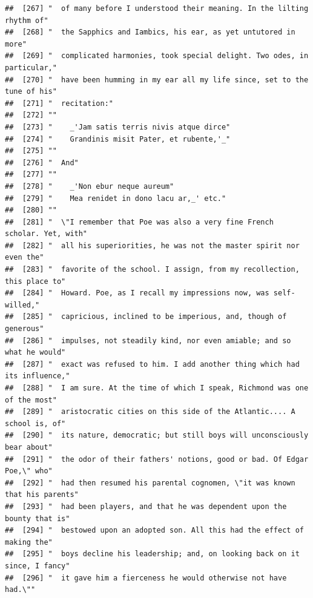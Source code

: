 \documentclass{article}\usepackage[]{graphicx}\usepackage[]{color}
\makeatletter
\newenvironment{kframe}{%
 \def\at@end@of@kframe{}%
 \ifinner\ifhmode%
  \def\at@end@of@kframe{\end{minipage}}%
  \begin{minipage}{\columnwidth}%
 \fi\fi%
 \def\FrameCommand##1{\hskip\@totalleftmargin \hskip-\fboxsep
 \colorbox{shadecolor}{##1}\hskip-\fboxsep
     \hskip-\linewidth \hskip-\@totalleftmargin \hskip\columnwidth}%
 \MakeFramed {\advance\hsize-\width
   \@totalleftmargin\z@ \linewidth\hsize
   \@setminipage}}%
 {\par\unskip\endMakeFramed%
 \at@end@of@kframe}
\newenvironment{knitrout}{}{} %
\makeatother
\begin{document}
\begin{knitrout}
\begin{kframe}
\begin{verbatim}
##  [267] "  of many before I understood their meaning. In the lilting rhythm of"       
##  [268] "  the Sapphics and Iambics, his ear, as yet untutored in more"               
##  [269] "  complicated harmonies, took special delight. Two odes, in particular,"     
##  [270] "  have been humming in my ear all my life since, set to the tune of his"     
##  [271] "  recitation:"                                                               
##  [272] ""                                                                            
##  [273] "    _'Jam satis terris nivis atque dirce"                                    
##  [274] "    Grandinis misit Pater, et rubente,'_"                                    
##  [275] ""                                                                            
##  [276] "  And"                                                                       
##  [277] ""                                                                            
##  [278] "    _'Non ebur neque aureum"                                                 
##  [279] "    Mea renidet in dono lacu ar,_' etc."                                     
##  [280] ""                                                                            
##  [281] "  \"I remember that Poe was also a very fine French scholar. Yet, with"      
##  [282] "  all his superiorities, he was not the master spirit nor even the"          
##  [283] "  favorite of the school. I assign, from my recollection, this place to"     
##  [284] "  Howard. Poe, as I recall my impressions now, was self-willed,"             
##  [285] "  capricious, inclined to be imperious, and, though of generous"             
##  [286] "  impulses, not steadily kind, nor even amiable; and so what he would"       
##  [287] "  exact was refused to him. I add another thing which had its influence,"    
##  [288] "  I am sure. At the time of which I speak, Richmond was one of the most"     
##  [289] "  aristocratic cities on this side of the Atlantic.... A school is, of"      
##  [290] "  its nature, democratic; but still boys will unconsciously bear about"      
##  [291] "  the odor of their fathers' notions, good or bad. Of Edgar Poe,\" who"      
##  [292] "  had then resumed his parental cognomen, \"it was known that his parents"   
##  [293] "  had been players, and that he was dependent upon the bounty that is"       
##  [294] "  bestowed upon an adopted son. All this had the effect of making the"       
##  [295] "  boys decline his leadership; and, on looking back on it since, I fancy"    
##  [296] "  it gave him a fierceness he would otherwise not have had.\""               

\end{verbatim}
\end{kframe}
\end{knitrout}
\end{document}

